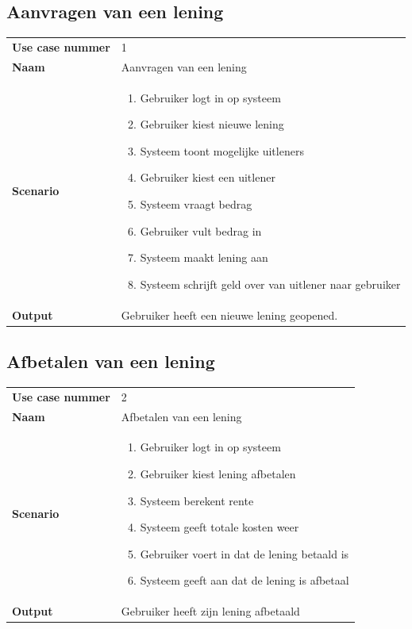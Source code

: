 \documentclass[11pt,english]{article}
\begin{document}
	\subsection{Aanvragen van een lening}
	\begin{tabularx}{\textwidth}{ l | X }
		\textbf{Use case nummer} & 1 \\
		\textbf{Naam} & Aanvragen van een lening \\
		\textbf{Scenario} &
		\begin{enumerate}
			\item Gebruiker logt in op systeem
			\item Gebruiker kiest nieuwe lening
			\item Systeem toont mogelijke uitleners
			\item Gebruiker kiest een uitlener
			\item Systeem vraagt bedrag
			\item Gebruiker vult bedrag in
			\item Systeem maakt lening aan
			\item Systeem schrijft geld over van uitlener naar gebruiker
		\end{enumerate} \\
		\textbf{Output} & Gebruiker heeft een nieuwe lening geopened.
	\end{tabularx}

	\newpage
	\subsection{Afbetalen van een lening}
	\begin{tabularx}{\textwidth}{ l | X }
		\textbf{Use case nummer} & 2 \\
		\textbf{Naam} & Afbetalen van een lening \\
		\textbf{Scenario} &
		\begin{enumerate}
			\item Gebruiker logt in op systeem
			\item Gebruiker kiest lening afbetalen
			\item Systeem berekent rente
			\item Systeem geeft totale kosten weer
			\item Gebruiker voert in dat de lening betaald is
			\item Systeem geeft aan dat de lening is afbetaal
		\end{enumerate} \\
		\textbf{Output} & Gebruiker heeft zijn lening afbetaald
	\end{tabularx}
\end{document}
